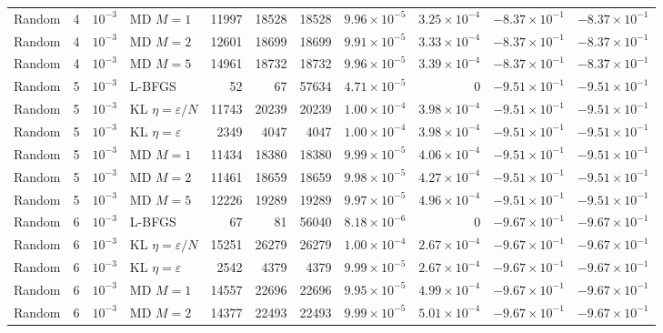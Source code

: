 \begin{table}[t]
\begin{tabular}{llllrrrrrrr}
Random & 4 & $10^{-3}$ & MD $M=1$ & 11997 & 18528 & 18528 & $9.96\times 10^{-5}$ & $3.25\times 10^{-4}$ & $-8.37\times 10^{-1}$ & $-8.37\times 10^{-1}$ \\
Random & 4 & $10^{-3}$ & MD $M=2$ & 12601 & 18699 & 18699 & $9.91\times 10^{-5}$ & $3.33\times 10^{-4}$ & $-8.37\times 10^{-1}$ & $-8.37\times 10^{-1}$ \\
Random & 4 & $10^{-3}$ & MD $M=5$ & 14961 & 18732 & 18732 & $9.96\times 10^{-5}$ & $3.39\times 10^{-4}$ & $-8.37\times 10^{-1}$ & $-8.37\times 10^{-1}$ \\
\midrule
Random & 5 & $10^{-3}$ & L-BFGS & 52 & 67 & 57634 & $4.71\times 10^{-5}$ & 0 & $-9.51\times 10^{-1}$ & $-9.51\times 10^{-1}$ \\
Random & 5 & $10^{-3}$ & KL $\eta=\varepsilon/N$ & 11743 & 20239 & 20239 & $1.00\times 10^{-4}$ & $3.98\times 10^{-4}$ & $-9.51\times 10^{-1}$ & $-9.51\times 10^{-1}$ \\
Random & 5 & $10^{-3}$ & KL $\eta=\varepsilon$ & 2349 & 4047 & 4047 & $1.00\times 10^{-4}$ & $3.98\times 10^{-4}$ & $-9.51\times 10^{-1}$ & $-9.51\times 10^{-1}$ \\
Random & 5 & $10^{-3}$ & MD $M=1$ & 11434 & 18380 & 18380 & $9.99\times 10^{-5}$ & $4.06\times 10^{-4}$ & $-9.51\times 10^{-1}$ & $-9.51\times 10^{-1}$ \\
Random & 5 & $10^{-3}$ & MD $M=2$ & 11461 & 18659 & 18659 & $9.98\times 10^{-5}$ & $4.27\times 10^{-4}$ & $-9.51\times 10^{-1}$ & $-9.51\times 10^{-1}$ \\
Random & 5 & $10^{-3}$ & MD $M=5$ & 12226 & 19289 & 19289 & $9.97\times 10^{-5}$ & $4.96\times 10^{-4}$ & $-9.51\times 10^{-1}$ & $-9.51\times 10^{-1}$ \\
\midrule
Random & 6 & $10^{-3}$ & L-BFGS & 67 & 81 & 56040 & $8.18\times 10^{-6}$ & 0 & $-9.67\times 10^{-1}$ & $-9.67\times 10^{-1}$ \\
Random & 6 & $10^{-3}$ & KL $\eta=\varepsilon/N$ & 15251 & 26279 & 26279 & $1.00\times 10^{-4}$ & $2.67\times 10^{-4}$ & $-9.67\times 10^{-1}$ & $-9.67\times 10^{-1}$ \\
Random & 6 & $10^{-3}$ & KL $\eta=\varepsilon$ & 2542 & 4379 & 4379 & $9.99\times 10^{-5}$ & $2.67\times 10^{-4}$ & $-9.67\times 10^{-1}$ & $-9.67\times 10^{-1}$ \\
Random & 6 & $10^{-3}$ & MD $M=1$ & 14557 & 22696 & 22696 & $9.95\times 10^{-5}$ & $4.99\times 10^{-4}$ & $-9.67\times 10^{-1}$ & $-9.67\times 10^{-1}$ \\
Random & 6 & $10^{-3}$ & MD $M=2$ & 14377 & 22493 & 22493 & $9.99\times 10^{-5}$ & $5.01\times 10^{-4}$ & $-9.67\times 10^{-1}$ & $-9.67\times 10^{-1}$ \\

\end{tabular}
\end{table}
